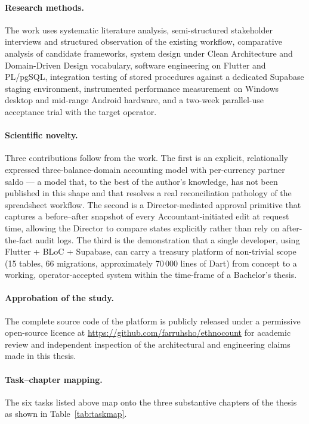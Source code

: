 \paragraph{Research methods.}
The work uses systematic literature analysis, semi-structured stakeholder interviews and structured observation of the existing workflow, comparative analysis of candidate frameworks, system design under Clean Architecture and Domain-Driven Design vocabulary, software engineering on Flutter and PL/pgSQL, integration testing of stored procedures against a dedicated Supabase staging environment, instrumented performance measurement on Windows desktop and mid-range Android hardware, and a two-week parallel-use acceptance trial with the target operator.

\paragraph{Scientific novelty.}
Three contributions follow from the work. The first is an explicit, relationally expressed three-balance-domain accounting model with per-currency partner saldo --- a model that, to the best of the author's knowledge, has not been published in this shape and that resolves a real reconciliation pathology of the spreadsheet workflow. The second is a Director-mediated approval primitive that captures a before--after snapshot of every Accountant-initiated edit at request time, allowing the Director to compare states explicitly rather than rely on after-the-fact audit logs. The third is the demonstration that a single developer, using Flutter + BLoC + Supabase, can carry a treasury platform of non-trivial scope (15 tables, 66 migrations, approximately 70\,000 lines of Dart) from concept to a working, operator-accepted system within the time-frame of a Bachelor's thesis.

\paragraph{Approbation of the study.}
The complete source code of the platform is publicly released under a permissive open-source licence at \url{https://github.com/farruhsho/ethnocount} for academic review and independent inspection of the architectural and engineering claims made in this thesis.

\paragraph{Task--chapter mapping.}
The six tasks listed above map onto the three substantive chapters of the thesis as shown in Table~\ref{tab:taskmap}.

